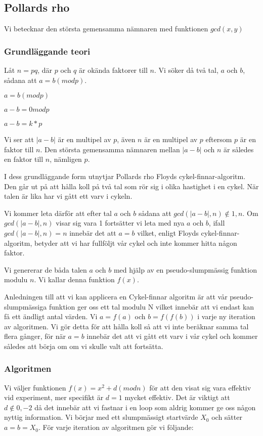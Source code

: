 \documentclass[a4paper,12pt]{article}
\renewcommand{\*}{\ensuremath{\cdot}}
\begin{document}
\subsection{Pollards rho}

Vi betecknar den största gemensamma nämnaren med funktionen $gcd(x,y)$
\subsubsection{Grundläggande teori}

Låt $n = pq$, där $p$ och $q$ är okända faktorer till $n$. 
Vi söker då två tal, $a$ och $b$, sådana att $a = b (mod p)$.

$a=b(mod p)$

$a-b = 0 mod p$

$a - b = k*p$

Vi ser att $|a-b|$ är en multipel av $p$, även $n$ är en multipel av $p$ eftersom $p$ är en faktor till $n$. Den största gemensamma nämnaren mellan $|a-b|$ och $n$ är således en faktor till $n$, nämligen $p$. 

I dess grundläggande form utnytjar Pollards rho Floyds cykel-finnar-algoritm. Den går ut på att hålla koll på två tal som rör sig i olika hastighet i en cykel. När talen är lika har vi gått ett varv i cykeln.

Vi kommer leta därför att efter tal $a$ och $b$ sådana att $gcd(|a-b|, n) \notin {1, n}$. Om $gcd(|a-b|, n)$ visar sig vara 1 fortsätter vi leta med nya $a$ och $b$, ifall $gcd(|a-b|, n) = n$ innebär det att $a=b$ vilket, enligt Floyds cykel-finnar-algoritm, betyder att vi har fullföljt vår cykel och inte kommer hitta någon faktor.

Vi genererar de båda talen $a$ och $b$ med hjälp av en pseudo-slumpmässig funktion modulu $n$. Vi kallar denna funktion $f(x)$.

Anledningen till att vi kan applicera en Cykel-finnar algoritm är att vår pseudo-slumpmässiga funktion ger oss ett tal modulu N vilket innebär att vi endast kan få ett ändligt antal värden. Vi $a=f(a)$ och $b=f(f(b))$ i varje ny iteration av algoritmen. Vi gör detta för att hålla koll så att vi inte beräknar samma tal flera gånger, för när $a=b$ innebär det att vi gått ett varv i vår cykel och kommer således att börja om om vi skulle valt att fortsätta.

\subsubsection{Algoritmen}
Vi väljer funktionen $f(x) = x^2 + d (mod n)$ för att den visat sig vara effektiv vid experiment, mer specifikt är $d=1$ mycket effektiv. Det är viktigt att $d \notin {0, -2}$ då det innebär att vi  fastnar i en loop som aldrig kommer ge oss någon nyttig information. Vi börjar med ett slumpmässigt startvärde $X_0$ och sätter $a=b=X_0$. För varje iteration av algoritmen gör vi följande:
\end{document}
